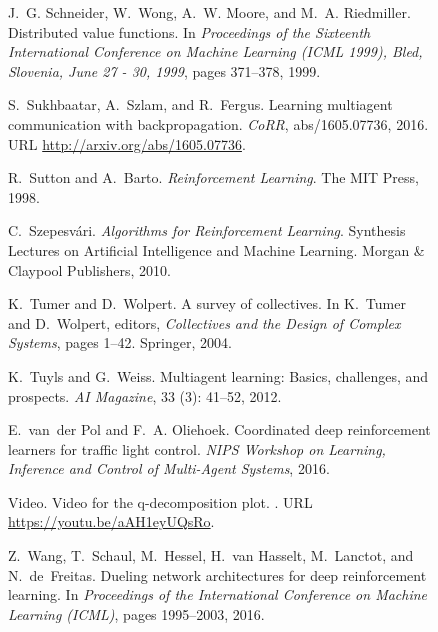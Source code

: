 \documentclass{article}
\begin{document}
\begin{SCfigure}
\begin{thebibliography}{40}
J.~G. Schneider, W.~Wong, A.~W. Moore, and M.~A. Riedmiller.
\newblock Distributed value functions.
\newblock In \emph{Proceedings of the Sixteenth International Conference on
  Machine Learning {(ICML} 1999), Bled, Slovenia, June 27 - 30, 1999}, pages
  371--378, 1999.

S.~Sukhbaatar, A.~Szlam, and R.~Fergus.
\newblock Learning multiagent communication with backpropagation.
\newblock \emph{CoRR}, abs/1605.07736, 2016.
\newblock URL \url{http://arxiv.org/abs/1605.07736}.

R.~Sutton and A.~Barto.
\newblock \emph{Reinforcement Learning}.
\newblock The MIT Press, 1998.

C.~Szepesv{\'{a}}ri.
\newblock \emph{Algorithms for Reinforcement Learning}.
\newblock Synthesis Lectures on Artificial Intelligence and Machine Learning.
  Morgan {\&} Claypool Publishers, 2010.

K.~Tumer and D.~Wolpert.
\newblock A survey of collectives.
\newblock In K.~Tumer and D.~Wolpert, editors, \emph{Collectives and the Design
  of Complex Systems}, pages 1--42. Springer, 2004.

K.~Tuyls and G.~Weiss.
\newblock Multiagent learning: Basics, challenges, and prospects.
\newblock \emph{{AI} Magazine}, 33 (3): 41--52, 2012.

E.~van~der Pol and F.~A. Oliehoek.
\newblock Coordinated deep reinforcement learners for traffic light control.
\newblock \emph{NIPS Workshop on Learning, Inference and Control of Multi-Agent
  Systems}, 2016.

{Video}.
\newblock Video for the q-decomposition plot.
.
\newblock URL \url{https://youtu.be/aAH1eyUQsRo}.

Z.~Wang, T.~Schaul, M.~Hessel, H.~van Hasselt, M.~Lanctot, and N.~de~Freitas.
\newblock Dueling network architectures for deep reinforcement learning.
\newblock In \emph{Proceedings of the International Conference on Machine
  Learning (ICML)}, pages 1995--2003, 2016.


\end{thebibliography}
\end{SCfigure}
\end{document}
